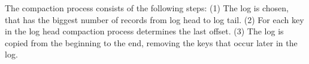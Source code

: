 The compaction process consists of the following steps:
(1) The log is chosen, that has the biggest number of records from log head to log tail.
(2) For each key in the log head compaction process determines the last offset.
(3) The log is copied from the beginning to the end, removing the keys that occur later in the log. 
   


